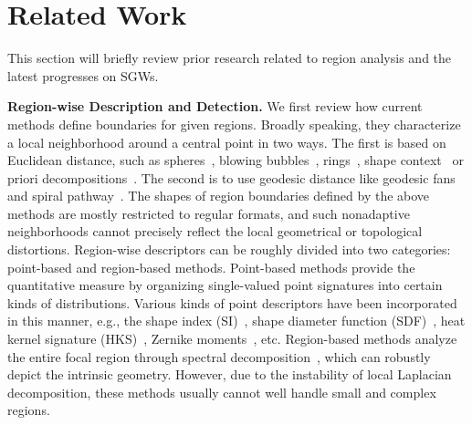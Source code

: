 \section{Related Work}
\label{sec:RW}

This section will briefly review prior research related to region
analysis and the latest progresses on SGWs.

\textbf{Region-wise Description and Detection.} We first review how
current methods define boundaries for given regions. Broadly speaking,
they characterize a local neighborhood around a central point in two
ways. The first is based on Euclidean distance, such as
spheres~\cite{Kazhdan:2003}, blowing bubbles~\cite{Mortara:03},
rings~\cite{Gatzke:2005}, shape context~\cite{Kokkinos:2012} or priori
decompositions~\cite{Gal2006,Itskovich2011}. The second is to use
geodesic distance like geodesic fans~\cite{Zelinka:2004} and spiral
pathway~\cite{Lavoue:2011}. The shapes of region boundaries defined by
the above methods are mostly restricted to regular formats, and such
nonadaptive neighborhoods cannot precisely reflect the local
geometrical or topological distortions. Region-wise descriptors can be
roughly divided into two categories: point-based and region-based
methods. Point-based methods provide the quantitative measure by
organizing single-valued point signatures into certain kinds of
distributions. Various kinds of point descriptors have been
incorporated in this manner, e.g., the shape index
(SI)~\cite{Toldo:2009}, shape diameter function
(SDF)~\cite{Shapira:2010}, heat kernel signature
(HKS)~\cite{Bronstein:2013}, Zernike
moments~\cite{Maximo:2011:RRI:2027471}, etc. Region-based methods
analyze the entire focal region through spectral
decomposition~\cite{Hu2009,JiangZZ:13}, which can robustly depict the
intrinsic geometry. However, due to the instability of local Laplacian
decomposition, these methods usually cannot well handle small and
complex regions.

